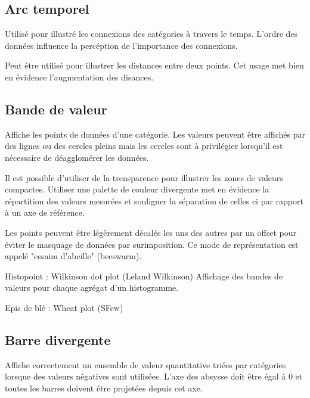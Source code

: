 \documentclass[a4paper,12pt]{article}
\begin{document}
\begin{multicols}{2}
\subsection*{Arc temporel}
\label{sec:org4538168}
Utilisé pour illustré les connexions des catégories à travers le temps. L'ordre des données influence la percéption de l'importance des connexions. \autocite{jonathanschwabishRelationship2021}

Peut être utilisé pour illustrer les distances entre deux points. Cet usage met bien en évidence l'augmentation des disances. \autocite{jonathanschwabishRelationship2021}
\subsection*{Bande de valeur}
\label{sec:org371b21a}
Affiche les points de données d'une catégorie.\autocite{jonathanschwabishDistribution2021} Les valeurs peuvent être affichés par des lignes ou des cercles pleins mais les cercles sont à privilégier lorsqu'il est nécessaire de déagglomérer les données.

Il est possible d'utiliser de la trensparence pour illustrer les zones de valeurs compactes. \autocite{jonathanschwabishDistribution2021} Utiliser une palette de couleur divergente met en évidence la répartition des valeurs mesurées et souligner la séparation de celles ci par rapport à un axe de référence.\autocite{jonathanschwabishDistribution2021}

Les points peuvent être légèrement décalés les uns des autres par un offset pour éviter le masquage de données par surimposition. Ce mode de représentation est appelé "essaim d'abeille" (beeswarm). \autocite{jonathanschwabishDistribution2021}

Histopoint : Wilkinson dot plot (Leland Wilkinson) Affichage des bandes de valeurs pour chaque agrégat d'un histogramme.\autocite{jonathanschwabishDistribution2021}

Epis de blé : Wheat plot (SFew)
\subsection*{Barre divergente}
\label{sec:org9422109}
Affiche correctement un ensemble de valeur quantitative triées par catégories lorsque des valeurs négatives sont utilisées. \autocite{alansmithLexiqueVisuel} L'axe des absysse doit être égal à 0 et toutes les barres doivent être projetées depuis cet axe.

\end{multicols}
\end{document}
